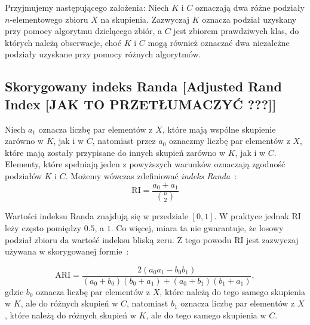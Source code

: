 \documentclass{praca1}
\begin{document}
Przyjmujemy następującego założenia: Niech $K$ i $C$ oznaczają dwa różne podziały $n$-elementowego zbioru $X$ na skupienia. Zazwyczaj $K$ oznacza podział uzyskany przy pomocy algorytmu dzielącego zbiór, a $C$ jest zbiorem prawdziwych klas, do których należą obserwacje, choć $K$ i $C$ mogą również oznaczać dwa niezależne podziały uzyskane przy pomocy różnych algorytmów.

\subsection{Skorygowany indeks Randa [Adjusted Rand Index [JAK TO PRZETŁUMACZYĆ ???]]}

Niech $a_1$ oznacza liczbę par elementów z $X$, które mają wspólne skupienie zarówno w $K$, jak i w $C$, natomiast przez $a_0$ oznaczmy liczbę par elementów z $X$, które mają zostały przypisane do innych skupień zarówno w $K$, jak i w $C$. Elementy, które spełniają jeden z powyższych warunków oznaczają zgodność podziałów $K$ i $C$. Możemy wówczas zdefiniować \emph{indeks Randa}~\cite{Rand1971:objective}:
\begin{equation}
\textrm{RI} = \frac{a_0+a_1}{{n \choose 2} }
\end{equation}

Wartości indeksu Randa znajdują się w przedziale $[0,1]$. W praktyce jednak $\textrm{RI}$ leży często pomiędzy $0.5$, a $1$. Co więcej, miara ta nie gwarantuje, że losowy podział zbioru da wartość indeksu bliską zeru. Z tego powodu $\textrm{RI}$ jest zazwyczaj używana w skorygowanej formie~\cite{Lawrence1985:comparing}:

\begin{equation}
\textrm{ARI} = \frac{2 (a_0 a_1 - b_0 b_1) }{(a_0 + b_0)(b_0 + a_1) + (a_0 + b_1)(b_1 + a_1)},
\end{equation}
gdzie $b_0$ oznacza liczbę par elementów z $X$, które należą do tego samego skupienia w $K$, ale do różnych skupień w $C$, natomiast $b_1$ oznacza liczbę par elementów z $X$, które należą do różnych skupień w $K$, ale do tego samego skupienia w $C$.



\end{document}
